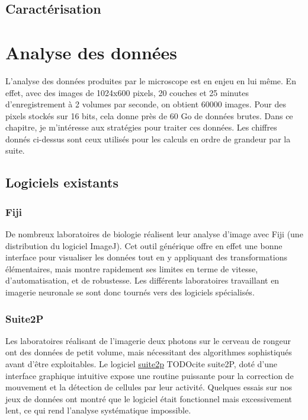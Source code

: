 \subsection{Caractérisation}


\section{Analyse des données}

L'analyse des données produites par le microscope est en enjeu en lui même. En effet, avec des images de 1024x600 pixels, 20 couches et 25 minutes d'enregistrement à 2 volumes par seconde, on obtient 60000 images. Pour des pixels stockés sur 16 bits, cela donne près de 60 Go de données brutes. Dans ce chapitre, je m'intéresse aux stratégies pour traiter ces données. Les chiffres donnés ci-dessus sont ceux utilisés pour les calculs en ordre de grandeur par la suite.

\subsection{Logiciels existants}

\subsubsection{Fiji}

De nombreux laboratoires de biologie réalisent leur analyse d'image avec Fiji (une distribution du logiciel ImageJ). Cet outil générique offre en effet une bonne interface pour visualiser les données tout en y appliquant des transformations élémentaires, mais montre rapidement ses limites en terme de vitesse, d'automatisation, et de robustesse. Les différents laboratoires travaillant en imagerie neuronale se sont donc tournés vers des logiciels spécialisés.

\subsubsection{Suite2P}

Les laboratoires réalisant de l'imagerie deux photons sur le cerveau de rongeur ont des données de petit volume, mais nécessitant des algorithmes sophistiqués avant d'être exploitables. Le logiciel \href{https://www.suite2p.org/}{suite2p} TODOcite suite2P, doté d'une interface graphique intuitive expose une routine puissante pour la correction de mouvement et la détection de cellules par leur activité. Quelques essais sur nos jeux de données ont montré que le logiciel était fonctionnel mais excessivement lent, ce qui rend l'analyse systématique impossible.

